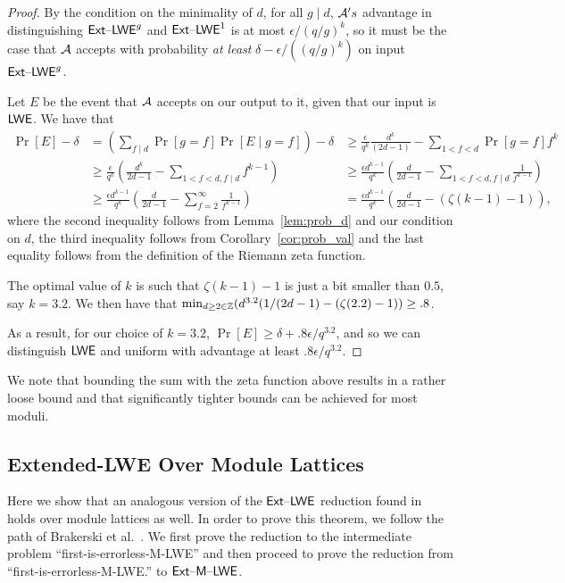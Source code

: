 \begin{proof}
By the condition on the minimality of $d$, for all $g \mid d$,
$\mathcal{A}'s$ advantage in distinguishing $\mathsf{Ext \text{\textendash} LWE}^{g}$ and
$\mathsf{Ext \text{\textendash} LWE}^1$ is at most $\epsilon/(q/g)^k$, so it must be the case that
$\mathcal{A}$ accepts with probability \emph{at least}
$\delta-\epsilon/((q/g)^k)$ on input $\mathsf{Ext \text{\textendash} LWE}^{g}$.


Let $E$ be the event that $\mathcal{A}$ accepts on our output to it, given
that our input is $\mathsf{LWE}$. 
We have that
\begin{align*}
\Pr[E]-\delta&=(\sum_{f\mid d}\Pr[g=f]\Pr[E \mid g=f]) - \delta &\geq \tfrac{\epsilon}{q^k}\tfrac{d^k}{(2d-1)} - \sum_{1 < f<d}\Pr[g=f]f^k\\
&\geq \tfrac{\epsilon}{q^k}(\tfrac{d^k}{2d-1} - \sum_{1<f<d, f \mid
  d}f^{k-1})
&\geq \tfrac{\epsilon d^{k-1}}{q^k}(\tfrac{d}{2d-1} - \sum_{1<f<d, f \mid
  d}\tfrac{1}{f^{k-1}})\\
&\geq  \tfrac{\epsilon
  d^{k-1}}{q^k}(\tfrac{d}{2d-1}-\sum_{f=2}^{\infty}\tfrac{1}{f^{k-1}})
&= \tfrac{\epsilon d^{k-1}}{q^{k}}(\tfrac{d}{2d-1} - (\zeta(k-1)-1)),
\end{align*}
where the second inequality follows from Lemma~\ref{lem:prob_d} and our
condition on $d$, the third inequality follows from Corollary~\ref{cor:prob_val}
 and the last equality follows from the definition of the Riemann zeta
 function.

The optimal value of $k$ is such that $\zeta(k-1)-1$ is just a
bit smaller than $0.5$, say $k=3.2$. We then have that $\min_{d \geq 2 \in \mathbb{Z}}(d^{3.2}(1/(2d-1)-(\zeta(2.2)-1)) \geq .8$.

As a result, for our choice of $k=3.2$,
$\Pr[E] \geq \delta+.8\epsilon/q^{3.2}$, and so we can distinguish
$\mathsf{LWE}$ and uniform with advantage at least $.8\epsilon/q^{3.2}$.
\end{proof}
\iflncs
\else
We note that bounding the sum with the zeta function above results in
a rather loose bound and that significantly tighter bounds can be
achieved for most moduli. 
\fi
\iflncs
\else
\subsection{Extended-LWE Over Module Lattices}
\label{sec:extended-lwe-over}


Here we show that an analogous version of the $\mathsf{Ext \text{\textendash} LWE}$ reduction
found in~\cite{DBLP:conf/stoc/BrakerskiLPRS13} holds over module
lattices as well. In order to prove this theorem, we follow the
path of Brakerski et al.~\cite{DBLP:conf/stoc/BrakerskiLPRS13}.  We
first prove the reduction to the intermediate problem
``first-is-errorless-M-LWE'' and then proceed to prove the reduction
from ``first-is-errorless-M-LWE.'' to $\mathsf{Ext \text{\textendash} M \text{\textendash} LWE}$.


